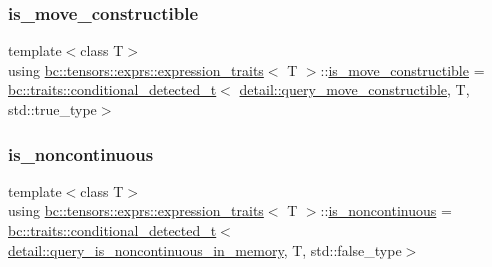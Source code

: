 \mbox{\label{structbc_1_1tensors_1_1exprs_1_1expression__traits_a79f84851dcb50d4b56daa25301a3f9fb}} 
\subsubsection{\texorpdfstring{is\+\_\+move\+\_\+constructible}{is\_move\_constructible}}
{\footnotesize\ttfamily template$<$class T$>$ \\
using \hyperlink{structbc_1_1tensors_1_1exprs_1_1expression__traits}{bc\+::tensors\+::exprs\+::expression\+\_\+traits}$<$ T $>$\+::\hyperlink{structbc_1_1tensors_1_1exprs_1_1expression__traits_a79f84851dcb50d4b56daa25301a3f9fb}{is\+\_\+move\+\_\+constructible} =  \hyperlink{namespacebc_1_1traits_a1a6d378947ec32acd457890854bcd592}{bc\+::traits\+::conditional\+\_\+detected\+\_\+t}$<$ \hyperlink{namespacebc_1_1tensors_1_1exprs_1_1detail_a19fd04baa3f6d8fcce66c01e51b7399d}{detail\+::query\+\_\+move\+\_\+constructible}, T, std\+::true\+\_\+type$>$}

\mbox{\label{structbc_1_1tensors_1_1exprs_1_1expression__traits_a2c5c0695ef22b12b53db910f40ff32a4}} 
\subsubsection{\texorpdfstring{is\+\_\+noncontinuous}{is\_noncontinuous}}
{\footnotesize\ttfamily template$<$class T$>$ \\
using \hyperlink{structbc_1_1tensors_1_1exprs_1_1expression__traits}{bc\+::tensors\+::exprs\+::expression\+\_\+traits}$<$ T $>$\+::\hyperlink{structbc_1_1tensors_1_1exprs_1_1expression__traits_a2c5c0695ef22b12b53db910f40ff32a4}{is\+\_\+noncontinuous} =  \hyperlink{namespacebc_1_1traits_a1a6d378947ec32acd457890854bcd592}{bc\+::traits\+::conditional\+\_\+detected\+\_\+t}$<$ \hyperlink{namespacebc_1_1tensors_1_1exprs_1_1detail_aa6d73fadec8691f52ebcd7254c6ec9bb}{detail\+::query\+\_\+is\+\_\+noncontinuous\+\_\+in\+\_\+memory}, T, std\+::false\+\_\+type$>$}

